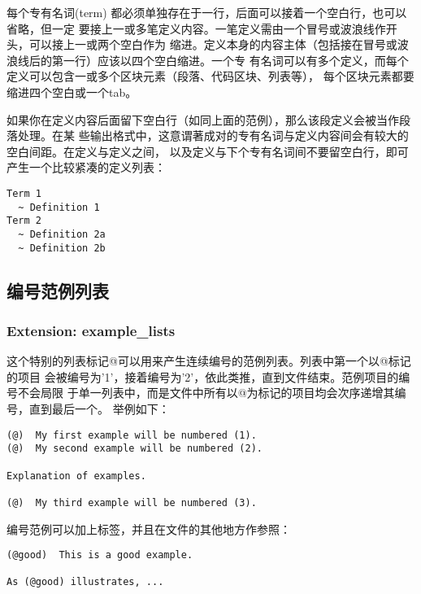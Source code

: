 \documentclass[fancyhdr,bookmark]{ctexbook}
\begin{document}
每个专有名词(term)
都必须单独存在于一行，后面可以接着一个空白行，也可以省略，但一定
要接上一或多笔定义内容。一笔定义需由一个冒号或波浪线作开头，可以接上一或两个空白作为
缩进。定义本身的内容主体（包括接在冒号或波浪线后的第一行）应该以四个空白缩进。一个专
有名词可以有多个定义，而每个定义可以包含一或多个区块元素（段落、代码区块、列表等），
每个区块元素都要缩进四个空白或一个tab。

如果你在定义内容后面留下空白行（如同上面的范例），那么该段定义会被当作段落处理。在某
些输出格式中，这意谓著成对的专有名词与定义内容间会有较大的空白间距。在定义与定义之间，
以及定义与下个专有名词间不要留空白行，即可产生一个比较紧凑的定义列表：

\begin{lstlisting}
Term 1
  ~ Definition 1
Term 2
  ~ Definition 2a
  ~ Definition 2b
\end{lstlisting}

\hypertarget{ux7f16ux53f7ux8303ux4f8bux5217ux8868}{%
\subsection{编号范例列表}\label{ux7f16ux53f7ux8303ux4f8bux5217ux8868}}

\hypertarget{extension-example_lists}{%
\subsubsection{Extension:
example\_lists}\label{extension-example_lists}}

这个特别的列表标记@可以用来产生连续编号的范例列表。列表中第一个以@标记的项目
会被编号为'1'，接着编号为'2'，依此类推，直到文件结束。范例项目的编号不会局限
于单一列表中，而是文件中所有以@为标记的项目均会次序递增其编号，直到最后一个。
举例如下：

\begin{lstlisting}
(@)  My first example will be numbered (1).
(@)  My second example will be numbered (2).

Explanation of examples.

(@)  My third example will be numbered (3).
\end{lstlisting}

编号范例可以加上标签，并且在文件的其他地方作参照：

\begin{lstlisting}
(@good)  This is a good example.

As (@good) illustrates, ...
\end{lstlisting}
\end{document}
